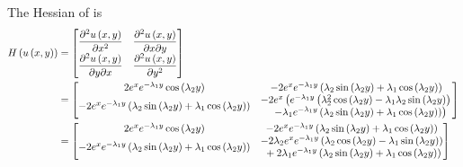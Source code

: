The Hessian of  is
\begin{equation}
  \begin{aligned}
    \hessian{}{\fnof{u}{x,y}}&=\begin{bmatrix}
    \deltwosqby{\fnof{u}{x,y}}{x} & \deltwoby{\fnof{u}{x,y}}{x}{y} \\
    \deltwoby{\fnof{u}{x,y}}{y}{x} & \deltwosqby{\fnof{u}{x,y}}{y}
    \end{bmatrix} \\
    &=\begin{bmatrix}
    2e^{x}e^{-\lambda_{1}{y}}\cosine{\lambda_{2}y} &
    -2e^{x}e^{-\lambda_{1}{y}}\pbrac{\lambda_{2}\sine{\lambda_{2}y}+\lambda_{1}\cosine{\lambda_{2}y}} \\
    -2e^{x}e^{-\lambda_{1}{y}}\pbrac{\lambda_{2}\sine{\lambda_{2}y}+\lambda_{1}\cosine{\lambda_{2}y}} &
    \begin{matrix}-2e^{x}\left(e^{-\lambda_{1}{y}}\pbrac{\lambda_{2}^{2}\cosine{\lambda_{2}y}-\lambda_{1}\lambda_{2}\sine{\lambda_{2}y}}\right.\\
      \hfil{}\left.-\lambda_{1}e^{-\lambda_{1}{y}}\pbrac{\lambda_{2}\sine{\lambda_{2}y}+\lambda_{1}\cosine{\lambda_{2}y}}\right)
    \end{matrix}\end{bmatrix}\\
    &=\begin{bmatrix}
    2e^{x}e^{-\lambda_{1}{y}}\cosine{\lambda_{2}y} &
    -2e^{x}e^{-\lambda_{1}{y}}\pbrac{\lambda_{2}\sine{\lambda_{2}y}+\lambda_{1}\cosine{\lambda_{2}y}} \\
    -2e^{x}e^{-\lambda_{1}{y}}\pbrac{\lambda_{2}\sine{\lambda_{2}y}+\lambda_{1}\cosine{\lambda_{2}y}} &
    \begin{matrix}-2\lambda_{2}e^{x}e^{-\lambda_{1}{y}}\pbrac{\lambda_{2}\cosine{\lambda_{2}y}-\lambda_{1}\sine{\lambda_{2}y}}\\
      \hfil{}+2\lambda_{1}e^{-\lambda_{1}{y}}\pbrac{\lambda_{2}\sine{\lambda_{2}y}+\lambda_{1}\cosine{\lambda_{2}y}}
    \end{matrix}
    \end{bmatrix}
  \end{aligned}
  \label{eqn:GeneralisedLaplaceTwoDAnalyticHessian1}
\end{equation}


